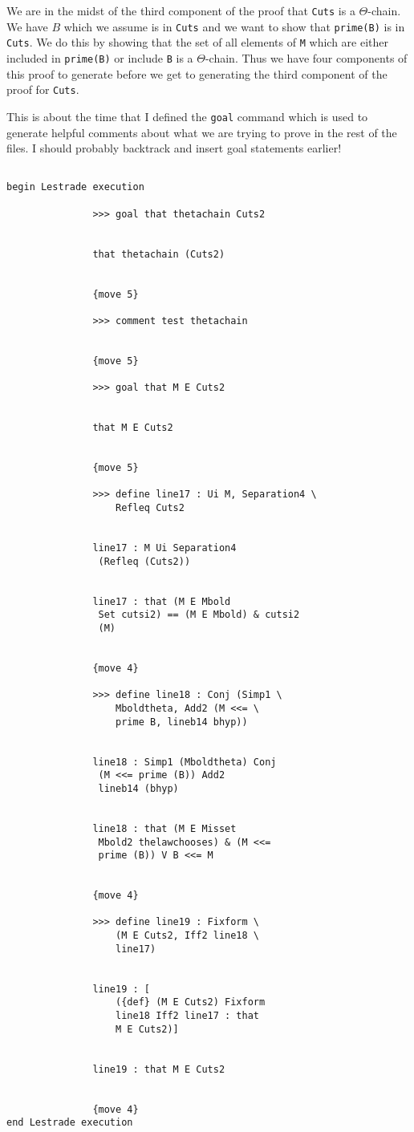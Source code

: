 \documentclass[12pt]{article}
\begin{document}
We are in the midst of the third component of the proof that {\tt Cuts} is a $\Theta$-chain.  We have $B$ which we assume is in {\tt Cuts}
and we want to show that {\tt prime(B)} is in {\tt Cuts}.  We do this by showing that the set of all elements of {\tt M} which are either included
in {\tt prime(B)} or include {\tt B} is a $\Theta$-chain.  Thus we have four components of this proof to generate before we get to generating the third component of
the proof for {\tt Cuts}.

This is about the time that I defined the {\tt goal} command which is used to generate helpful comments about what we are trying to prove in the rest of the files.  I should probably
backtrack and insert goal statements earlier!


\begin{verbatim}

begin Lestrade execution

               >>> goal that thetachain Cuts2


               that thetachain (Cuts2)


               {move 5}

               >>> comment test thetachain


               {move 5}

               >>> goal that M E Cuts2


               that M E Cuts2


               {move 5}

               >>> define line17 : Ui M, Separation4 \
                   Refleq Cuts2


               line17 : M Ui Separation4 
                (Refleq (Cuts2))


               line17 : that (M E Mbold 
                Set cutsi2) == (M E Mbold) & cutsi2 
                (M)


               {move 4}

               >>> define line18 : Conj (Simp1 \
                   Mboldtheta, Add2 (M <<= \
                   prime B, lineb14 bhyp))


               line18 : Simp1 (Mboldtheta) Conj 
                (M <<= prime (B)) Add2 
                lineb14 (bhyp)


               line18 : that (M E Misset 
                Mbold2 thelawchooses) & (M <<= 
                prime (B)) V B <<= M


               {move 4}

               >>> define line19 : Fixform \
                   (M E Cuts2, Iff2 line18 \
                   line17)


               line19 : [
                   ({def} (M E Cuts2) Fixform 
                   line18 Iff2 line17 : that 
                   M E Cuts2)]


               line19 : that M E Cuts2


               {move 4}
end Lestrade execution
\end{verbatim}
\end{document}

